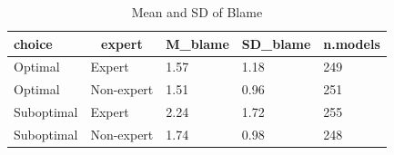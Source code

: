 \documentclass[
  man,floatsintext]{apa6}
\begin{document}
\begin{table}[tbp]

\begin{center}
\begin{threeparttable}

\caption{\label{tab:table-table1}Mean and SD of Blame}

\begin{tabular}{lllll}
\toprule
choice & \multicolumn{1}{c}{expert} & \multicolumn{1}{c}{M\_blame} & \multicolumn{1}{c}{SD\_blame} & \multicolumn{1}{c}{n.models}\\
\midrule
Optimal & Expert & 1.57 & 1.18 & 249\\
Optimal & Non-expert & 1.51 & 0.96 & 251\\
Suboptimal & Expert & 2.24 & 1.72 & 255\\
Suboptimal & Non-expert & 1.74 & 0.98 & 248\\
\bottomrule
\end{tabular}

\end{threeparttable}
\end{center}

\end{table}
\end{document}
